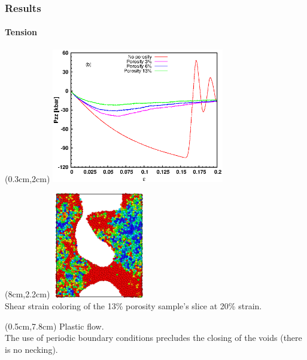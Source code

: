\documentclass[12pt,t]{beamer}
\begin{document}
\begin{frame}
    \frametitle{Results}
    \framesubtitle{Tension}
    \begin{textblock*}{7.5cm}(0.3cm,2cm) %
        \includegraphics[width=7.5cm]{Presentacion_PANACM_Franco/Pzz_strain_tens.eps}
    \end{textblock*}
    \begin{textblock*}{4cm}(8cm,2.2cm) %
        \includegraphics[width=4cm]{Presentacion_PANACM_Franco/13_20strain_tens.png}\\
        \centering
        \tiny{Shear strain coloring of the 13\% porosity sample’s slice at 20\% strain.}
    \end{textblock*}
    \begin{textblock*}{11.5cm}(0.5cm,7.8cm) %
        Plastic flow.\\
        The use of periodic boundary conditions precludes the closing of the voids (there is no necking).
    \end{textblock*}
\end{frame}
\end{document}
